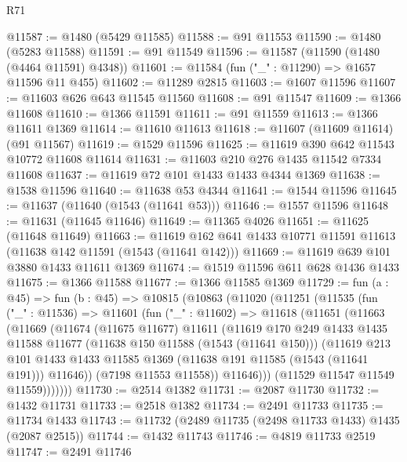 \begin{lexlean}{R71}
\begin{coremodule}
@11587 := @1480 (@5429 @11585)
@11588 := @91 @11553
@11590 := @1480 (@5283 @11588)
@11591 := @91 @11549
@11596 := @11587 (@11590 (@1480 (@4464 @11591) @4348))
@11601 := @11584 (fun ("_" : @11290) => @1657 @11596 @11 @455)
@11602 := @11289 @2815
@11603 := @1607 @11596
@11607 := @11603 @626 @643 @11545 @11560
@11608 := @91 @11547
@11609 := @1366 @11608
@11610 := @1366 @11591
@11611 := @91 @11559
@11613 := @1366 @11611 @1369
@11614 := @11610 @11613
@11618 := @11607 (@11609 @11614) (@91 @11567)
@11619 := @1529 @11596
@11625 := @11619 @390 @642 @11543 @10772 @11608 @11614
@11631 := @11603 @210 @276 @1435 @11542 @7334 @11608
@11637 := @11619 @72 @101 @1433 @1433 @4344 @1369
@11638 := @1538 @11596
@11640 := @11638 @53 @4344
@11641 := @1544 @11596
@11645 := @11637 (@11640 (@1543 (@11641 @53)))
@11646 := @1557 @11596
@11648 := @11631 (@11645 @11646)
@11649 := @11365 @4026
@11651 := @11625 (@11648 @11649)
@11663 := @11619 @162 @641 @1433 @10771 @11591 @11613 (@11638 @142 @11591 (@1543 (@11641 @142)))
@11669 := @11619 @639 @101 @3880 @1433 @11611 @1369
@11674 := @1519 @11596 @611 @628 @1436 @1433
@11675 := @1366 @11588
@11677 := @1366 @11585 @1369
@11729 := fun (a : @45) =>
  fun (b : @45) =>
  @10815
    (@10863
      (@11020
        (@11251
          (@11535
            (fun ("_" : @11536) =>
            @11601
              (fun ("_" : @11602) =>
              @11618
                (@11651
                  (@11663
                    (@11669
                      (@11674
                        (@11675 @11677)
                        @11611
                        (@11619
                          @170
                          @249
                          @1433
                          @1435
                          @11588
                          @11677
                          (@11638 @150 @11588 (@1543 (@11641 @150)))
                          (@11619
                            @213
                            @101
                            @1433
                            @1433
                            @11585
                            @1369
                            (@11638 @191 @11585 (@1543 (@11641 @191)))
                            @11646))
                        (@7198 @11553 @11558))
                      @11646)))
                (@11529 @11547 @11549 @11559)))))))
@11730 := @2514 @1382
@11731 := @2087 @11730
@11732 := @1432 @11731
@11733 := @2518 @1382
@11734 := @2491 @11733
@11735 := @11734 @1433
@11743 := @11732 (@2489 @11735 (@2498 @11733 @1433) @1435 (@2087 @2515))
@11744 := @1432 @11743
@11746 := @4819 @11733 @2519
@11747 := @2491 @11746

\end{coremodule}
\end{lexlean}
